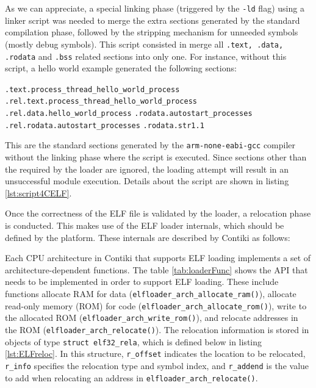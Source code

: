 As we can appreciate, a special linking phase (triggered by the \texttt{-ld} flag) using a linker script was needed to merge the extra sections generated by the standard compilation phase, followed by the stripping mechanism for unneeded symbols (mostly debug symbols).
This script consisted in merge all \texttt{.text, .data, .rodata} and \texttt{.bss} related sections into only one.
For instance, without this script, a hello world example generated the following sections:

\begin{listing}
	\texttt{.text.process\_thread\_hello\_world\_process} 
	\texttt{.rel.text.process\_thread\_hello\_world\_process}
	\texttt{.rel.data.hello\_world\_process}
	\texttt{.rodata.autostart\_processes}
	\texttt{.rel.rodata.autostart\_processes}
	\texttt{.rodata.str1.1}
\end{listing}

This are the standard sections generated by the \texttt{arm-none-eabi-gcc} compiler without the linking phase where the script is executed.
Since sections other than the required by the loader are ignored, the loading attempt will result in an unsuccessful module execution.
Details about the script are shown in listing \ref{lst:script4CELF}.

Once the correctness of the ELF file is validated by the loader, a relocation phase is conducted.
This makes use of the ELF loader internals, which should be defined by the platform.
These internals are described by Contiki as follows:
\begin{citeverbatim}
	Each CPU architecture in Contiki that supports ELF loading implements a set of architecture-dependent functions. 
	The table \ref{tab:loaderFunc} shows the API that needs to be implemented in order to support ELF loading. 
	These include functions allocate RAM for data (\texttt{elfloader\_arch\_allocate\_ram()}), allocate read-only memory (ROM) for code (\texttt{elfloader\_arch\_allocate\_rom()}), write to the allocated ROM (\texttt{elfloader\_arch\_write\_rom()}), and relocate addresses in the ROM (\texttt{elfloader\_arch\_relocate()}). 
	The relocation information is stored in objects of type \texttt{struct elf32\_rela}, which is defined below in listing \ref{lst:ELFreloc}. 
	In this structure, \texttt{r\_offset} indicates the location to be relocated, \texttt{r\_info} specifies the relocation type and symbol index, and \texttt{r\_addend} is the value to add when relocating an address in \texttt{elfloader\_arch\_relocate()}.
\end{citeverbatim}

